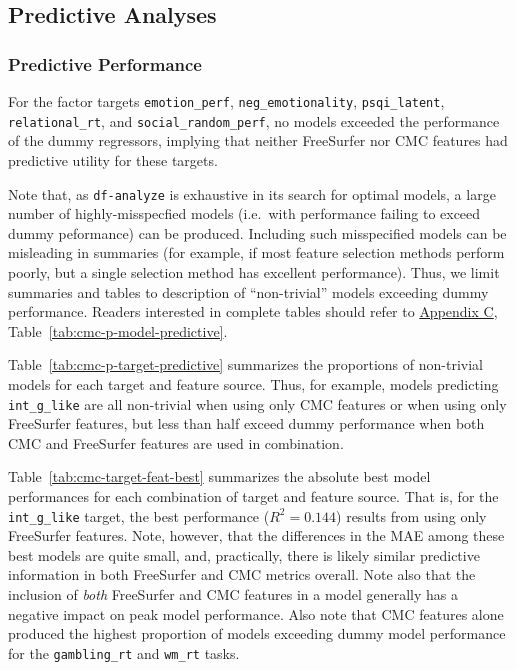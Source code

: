 \documentclass{article}
\newcommand{\CMC}{\(\text{CMC}\) }
\begin{document}
%


\subsection{Predictive Analyses}

\subsubsection{Predictive Performance} \label{sec:pred-performance}

For the factor targets \texttt{emotion\_perf}, \texttt{neg\_emotionality},
\texttt{psqi\_latent}, \texttt{relational\_rt}, and
\texttt{social\_random\_perf}, no models exceeded the performance of the
dummy regressors, implying that neither FreeSurfer nor CMC features had
predictive utility for these targets.

Note that, as \texttt{df-analyze} is exhaustive in its search for optimal
models, a large number of highly-misspecfied models (i.e.\ with performance
failing to exceed dummy peformance) can be produced. Including such
misspecified models can be misleading in summaries (for example, if most
feature selection methods perform poorly, but a single selection method has
excellent performance). Thus, we limit summaries and tables to description of
``non-trivial'' models exceeding dummy performance. Readers interested in
complete tables should refer to \hyperref[sec:appendix-c]{Appendix C},
Table~\ref{tab:cmc-p-model-predictive}.


Table~\ref{tab:cmc-p-target-predictive} summarizes the proportions of
non-trivial models for each target and feature source. Thus, for example,
models predicting \texttt{int\_g\_like} are all non-trivial when using only
\CMC features or when using only FreeSurfer features, but less than half
exceed dummy performance when both \CMC and FreeSurfer features are used
in combination.

Table~\ref{tab:cmc-target-feat-best} summarizes the absolute best model
performances for each combination of target and feature source. That is, for
the \texttt{int\_g\_like} target, the best performance (\(R^2=0.144\))
results from using only FreeSurfer features. Note, however, that the
differences in the MAE among these best models are quite small, and,
practically, there is likely similar predictive information in both
FreeSurfer and \CMC metrics overall. Note also that the inclusion of
\emph{both} FreeSurfer and \CMC features in a model generally has a negative
impact on peak model performance. Also note that CMC features alone produced
the highest proportion of models exceeding dummy model performance for the
\texttt{gambling\_rt} and \texttt{wm\_rt} tasks.
\end{document}
